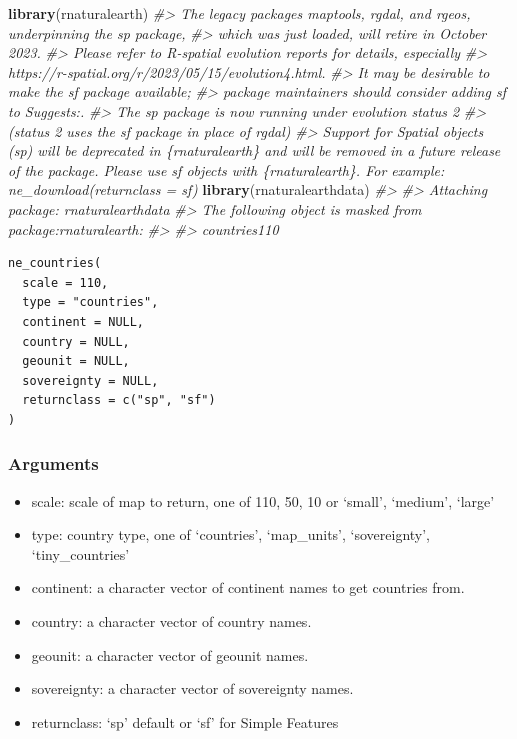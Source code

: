 \documentclass[
  xelatex, ja=standard]{bxjsbook}
\newenvironment{Shaded}{\begin{snugshade}}{\end{snugshade}}
\newcommand{\CommentTok}[1]{\textcolor[rgb]{0.56,0.35,0.01}{\textit{#1}}}
\newcommand{\FunctionTok}[1]{\textcolor[rgb]{0.13,0.29,0.53}{\textbf{#1}}}
\newcommand{\NormalTok}[1]{#1}
\providecommand{\tightlist}{%
  \setlength{\itemsep}{0pt}\setlength{\parskip}{0pt}}
\theoremstyle{definition}
\theoremstyle{definition}
\theoremstyle{definition}
\theoremstyle{definition}
\theoremstyle{remark}
\begin{document}
\begin{Shaded}
\begin{Highlighting}[]
\FunctionTok{library}\NormalTok{(rnaturalearth)}
\CommentTok{\#\textgreater{} The legacy packages maptools, rgdal, and rgeos, underpinning the sp package,}
\CommentTok{\#\textgreater{} which was just loaded, will retire in October 2023.}
\CommentTok{\#\textgreater{} Please refer to R{-}spatial evolution reports for details, especially}
\CommentTok{\#\textgreater{} https://r{-}spatial.org/r/2023/05/15/evolution4.html.}
\CommentTok{\#\textgreater{} It may be desirable to make the sf package available;}
\CommentTok{\#\textgreater{} package maintainers should consider adding sf to Suggests:.}
\CommentTok{\#\textgreater{} The sp package is now running under evolution status 2}
\CommentTok{\#\textgreater{}      (status 2 uses the sf package in place of rgdal)}
\CommentTok{\#\textgreater{} Support for Spatial objects (\textasciigrave{}sp\textasciigrave{}) will be deprecated in \{rnaturalearth\} and will be removed in a future release of the package. Please use \textasciigrave{}sf\textasciigrave{} objects with \{rnaturalearth\}. For example: \textasciigrave{}ne\_download(returnclass = \textquotesingle{}sf\textquotesingle{})\textasciigrave{}}
\FunctionTok{library}\NormalTok{(rnaturalearthdata)}
\CommentTok{\#\textgreater{} }
\CommentTok{\#\textgreater{} Attaching package: \textquotesingle{}rnaturalearthdata\textquotesingle{}}
\CommentTok{\#\textgreater{} The following object is masked from \textquotesingle{}package:rnaturalearth\textquotesingle{}:}
\CommentTok{\#\textgreater{} }
\CommentTok{\#\textgreater{}     countries110}
\end{Highlighting}
\end{Shaded}

\begin{verbatim}
ne_countries(
  scale = 110,
  type = "countries",
  continent = NULL,
  country = NULL,
  geounit = NULL,
  sovereignty = NULL,
  returnclass = c("sp", "sf")
)
\end{verbatim}

\hypertarget{arguments}{%
\subsubsection{Arguments}\label{arguments}}

\begin{itemize}
\tightlist
\item
  scale: scale of map to return, one of 110, 50, 10 or `small', `medium', `large'
\item
  type: country type, one of `countries', `map\_units', `sovereignty', `tiny\_countries'
\item
  continent: a character vector of continent names to get countries from.
\item
  country: a character vector of country names.
\item
  geounit: a character vector of geounit names.
\item
  sovereignty: a character vector of sovereignty names.
\item
  returnclass: `sp' default or `sf' for Simple Features
\end{itemize}
\end{document}
